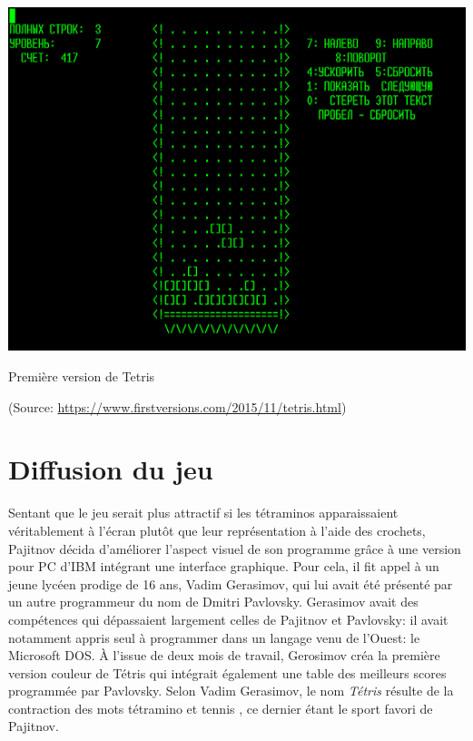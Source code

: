\begin{center}
	\includegraphics[scale=0.8]{media/premiere_version.png}
	
	Première version de Tetris 
	
	(Source: \url{https://www.firstversions.com/2015/11/tetris.html})
\end{center}

\section{Diffusion du jeu}

Sentant que le jeu serait plus attractif si les tétraminos apparaissaient \og véritablement \fg{} à l'écran plutôt que leur représentation à l'aide des crochets, Pajitnov décida d'améliorer l'aspect visuel de son programme grâce à une version pour PC d'IBM intégrant une interface graphique. Pour cela, il fit appel à un jeune lycéen prodige de 16 ans, Vadim Gerasimov, qui lui avait été présenté par un autre programmeur du nom de Dmitri Pavlovsky. Gerasimov avait des compétences qui dépassaient largement celles de Pajitnov et Pavlovsky: il avait notamment appris seul à programmer dans un langage venu de l'Ouest: le Microsoft DOS. \`A l'issue de deux mois de travail, Gerosimov créa la première version \og couleur \fg{} de Tétris qui intégrait également une table des meilleurs scores programmée par Pavlovsky.  Selon Vadim Gerasimov, le nom \textit{Tétris} résulte de la contraction des mots \og tétramino \fg{} et \og tennis \fg{}, ce dernier étant le sport favori de Pajitnov.


